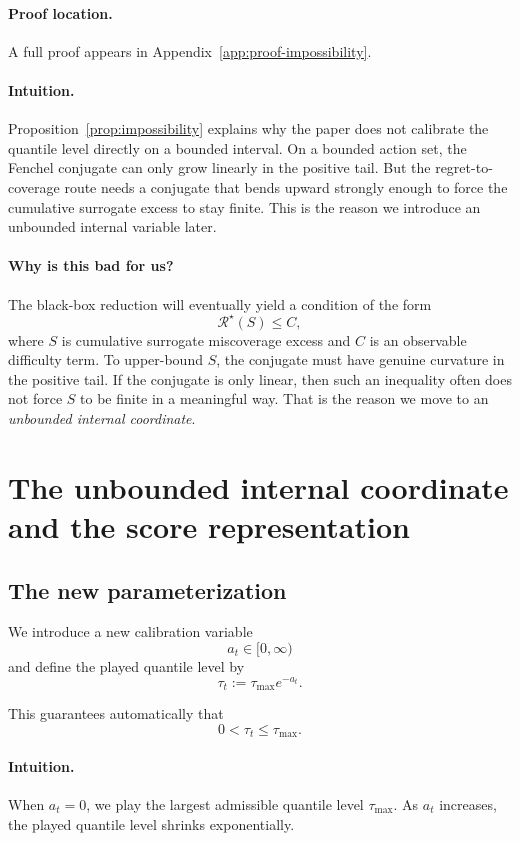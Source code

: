 \documentclass[11pt]{article}
\newcommand{\1}{\mathbf{1}}
\begin{document}
\paragraph{Proof location.} A full proof appears in Appendix~\ref{app:proof-impossibility}.


\paragraph{Intuition.} Proposition~\ref{prop:impossibility} explains why the paper does not calibrate the quantile level directly on a bounded interval. On a bounded action set, the Fenchel conjugate can only grow linearly in the positive tail. But the regret-to-coverage route needs a conjugate that bends upward strongly enough to force the cumulative surrogate excess to stay finite. This is the reason we introduce an unbounded internal variable later.


\paragraph{Why is this bad for us?}
The black-box reduction will eventually yield a condition of the form
\[
\mathcal R^\star(S)\le C,
\]
where $S$ is cumulative surrogate miscoverage excess and $C$ is an observable difficulty term. To upper-bound $S$, the conjugate must have genuine curvature in the positive tail. If the conjugate is only linear, then such an inequality often does not force $S$ to be finite in a meaningful way. That is the reason we move to an \emph{unbounded internal coordinate}.

\section{The unbounded internal coordinate and the score representation}

\subsection{The new parameterization}

We introduce a new calibration variable
\[
a_t\in[0,\infty)
\]
and define the played quantile level by
\begin{equation}
\label{eq:tau-param}
\tau_t:=\tau_{\max} e^{-a_t}.
\end{equation}

This guarantees automatically that
\[
0<\tau_t\le \tau_{\max}.
\]

\paragraph{Intuition.}
When $a_t=0$, we play the largest admissible quantile level $\tau_{\max}$. As $a_t$ increases, the played quantile level shrinks exponentially.
\end{document}
